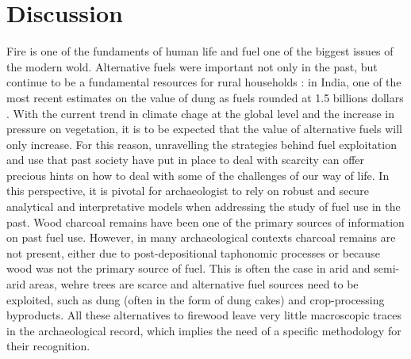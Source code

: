 \documentclass[authoryear,preprint,review,12pt]{elsarticle}
\begin{document}
\section{Discussion}
\label{sec:4}
Fire is one of the fundaments of human life and fuel one of the biggest issues of the modern wold. Alternative fuels were important not only in the past, but continue to be a fundamental resources for rural households \citep{Viswanathan2005}: in India, one of the most recent estimates on the value of dung as fuels rounded at 1.5 billions dollars \citep{Harris2000}. With the current trend in climate chage at the global level and the increase in pressure on vegetation, it is to be expected that the value of alternative fuels will only increase. For this reason, unravelling the strategies behind fuel exploitation and use that past society have put in place to deal with scarcity can offer precious hints on how to deal with some of the challenges of our way of life. In this perspective, it is pivotal for archaeologist to rely on robust and secure analytical and interpretative models when addressing the study of fuel use in the past. Wood charcoal remains have been one of the primary sources of information on past fuel use. However, in many archaeological contexts charcoal remains are not present, either due to post-depositional taphonomic processes or because wood was not the primary source of fuel. This is often the case in arid and semi-arid areas, wehre trees are scarce and alternative fuel sources need to be exploited, such as dung (often in the form of dung cakes) and crop-processing byproducts. All these alternatives to firewood leave very little macroscopic traces in the archaeological record, which implies the need of a specific methodology for their recognition.\par
\end{document}
